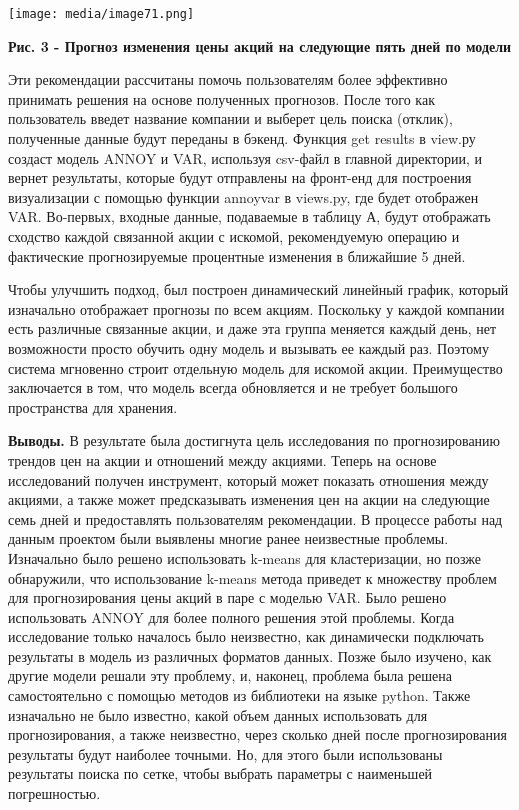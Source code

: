 \documentclass[
]{article}
\begin{document}
\texttt{[image: media/image71.png]}

\textbf{Рис. 3 - Прогноз изменения цены акций на следующие пять дней по
модели}

Эти рекомендации рассчитаны помочь пользователям более эффективно
принимать решения на основе полученных прогнозов. После того как
пользователь введет название компании и выберет цель поиска (отклик),
полученные данные будут переданы в бэкенд. Функция get results в view.ру
создаст модель ANNOY и VAR, используя csv-файл в главной директории, и
вернет результаты, которые будут отправлены на фронт-енд для построения
визуализации с помощью функции annoyvar в views.py, где будет отображен
VAR. Во-первых, входные данные, подаваемые в таблицу А, будут отображать
сходство каждой связанной акции с искомой, рекомендуемую операцию и
фактические прогнозируемые процентные изменения в ближайшие 5 дней.

Чтобы улучшить подход, был построен динамический линейный график,
который изначально отображает прогнозы по всем акциям. Поскольку у
каждой компании есть различные связанные акции, и даже эта группа
меняется каждый день, нет возможности просто обучить одну модель и
вызывать ее каждый раз. Поэтому система мгновенно строит отдельную
модель для искомой акции. Преимущество заключается в том, что модель
всегда обновляется и не требует большого пространства для хранения.

\textbf{Выводы.} В результате была достигнута цель исследования по
прогнозированию трендов цен на акции и отношений между акциями. Теперь
на основе исследований получен инструмент, который может показать
отношения между акциями, а также может предсказывать изменения цен на
акции на следующие семь дней и предоставлять пользователям рекомендации.
В процессе работы над данным проектом были выявлены многие ранее
неизвестные проблемы. Изначально было решено использовать k-means для
кластеризации, но позже обнаружили, что использование k-means метода
приведет к множеству проблем для прогнозирования цены акций в паре с
моделью VAR. Было решено использовать ANNOY для более полного решения
этой проблемы. Когда исследование только началось было неизвестно, как
динамически подключать результаты в модель из различных форматов данных.
Позже было изучено, как другие модели решали эту проблему, и, наконец,
проблема была решена самостоятельно с помощью методов из библиотеки на
языке python. Также изначально не было известно, какой объем данных
использовать для прогнозирования, а также неизвестно, через сколько дней
после прогнозирования результаты будут наиболее точными. Но, для этого
были использованы результаты поиска по сетке, чтобы выбрать параметры с
наименьшей погрешностью.
\end{document}
